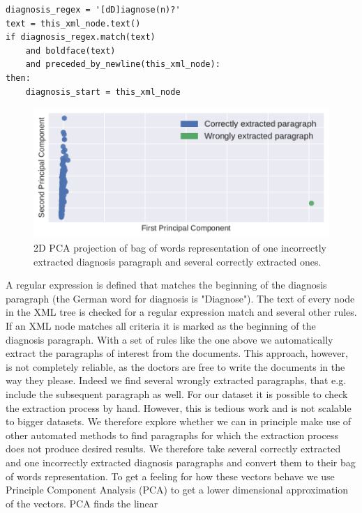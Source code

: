 \begin{lstlisting}
diagnosis_regex = '[dD]iagnose(n)?'
text = this_xml_node.text()
if diagnosis_regex.match(text)
	and boldface(text)
	and preceded_by_newline(this_xml_node):
then:
	diagnosis_start = this_xml_node
\end{lstlisting}

\bigskip
\begin{figure}
	\includegraphics[width=\linewidth]{figures/bow_find_odd}
	\caption{2D PCA projection of bag of words representation of one incorrectly extracted diagnosis paragraph and several correctly extracted ones.}
	\label{fig:bow_find_odd}
\end{figure}
A regular expression is defined that matches the beginning of the diagnosis paragraph (the German word for diagnosis is "Diagnose").
The text of every node in the XML tree is checked for a regular expression match and several other rules. If an XML node matches all criteria it is marked as the beginning of the diagnosis paragraph.
With a set of rules like the one above we automatically extract the
paragraphs of interest from the documents. This approach, however,
is not completely reliable, as the doctors are free to write the documents
in the way they please. Indeed we find several wrongly extracted paragraphs,
that e.g. include the subsequent paragraph as well. For our dataset
it is possible to check the extraction process by hand. However, this
is tedious work and is not scalable to bigger
datasets. We therefore explore whether we can in principle make use
of other automated methods to find paragraphs for which the extraction
process does not produce desired results. We therefore take several correctly extracted and one incorrectly extracted
diagnosis paragraphs and convert them to their bag of words representation.
To get a feeling for how these vectors behave we use Principle Component
Analysis (PCA) to get a lower dimensional approximation of the vectors. PCA finds the linear
